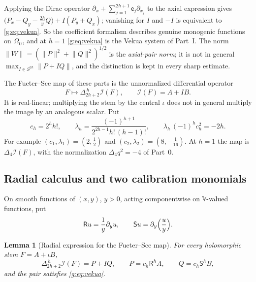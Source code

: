 \documentclass[11pt,a4paper]{article}
\numberwithin{equation}{section}
\newtheorem{lemma}[theorem]{Lemma}
\theoremstyle{definition}
\theoremstyle{remark}
\theoremstyle{plain}
\newcommand{\lap}{\Delta_4}
\newcommand{\I}{\mathcal I}
\newcommand{\Om}{\Omega}
\newcommand{\norm}[1]{\lVert #1\rVert}
\newcommand{\lapH}{\Delta_{2h+2}^{\,h}}
\newcommand{\VV}{\mathbb V}                       %
\begin{document}
Applying the Dirac operator $\partial_x+\sum_{j=1}^{2h+1}\mathsf e_j
\partial_{x_j}$ to the axial expression gives
$\bigl(P_x-Q_y-\tfrac{2h}{y}Q\bigr)+I(P_y+Q_x)$; vanishing for $I$ and $-I$ is
equivalent to \eqref{g:eq:vekua}. So the coefficient formalism describes
genuine monogenic functions on $\Om_U$, and at $h=1$ \eqref{g:eq:vekua} is the
Vekua system of Part~I. The norm $\norm W=(\norm P^2+\norm Q^2)^{1/2}$ is the
\emph{axial-pair norm}; it is not in general
$\max_{I\in S^{2h}}\norm{P+IQ}$, and the distinction is kept in every sharp
estimate.

The Fueter--Sce map of these parts is the unnormalized differential operator
\begin{equation}\label{g:eq:fueter-definition}
 F\longmapsto\lapH\I(F),\qquad \I(F)=A+IB .
\end{equation}
It is real-linear; multiplying the stem by the central $\iota$ does not in
general multiply the image by an analogous scalar. Put
\begin{equation}\label{g:eq:constants}
 c_h=2^hh!,\qquad
 \lambda_h=\frac{(-1)^{h+1}}{2^{2h-1}h!\,(h-1)!},\qquad
 \lambda_h\,(-1)^hc_h^2=-2h .
\end{equation}
For example $(c_1,\lambda_1)=(2,\tfrac12)$ and $(c_2,\lambda_2)=(8,-\tfrac1{16})$.
At $h=1$ the map is $\lap\I(F)$, with the normalization $\lap q^2=-4$ of
Part~0.

\subsection{Radial calculus and two calibration monomials}
\label{g:sub:radial}

On smooth functions of $(x,y)$, $y>0$, acting componentwise on $\VV$-valued
functions, put
\[
 \mathsf Ru=\frac1y\partial_yu,\qquad
 \mathsf Su=\partial_y\Bigl(\frac uy\Bigr).
\]

\begin{lemma}[Radial expression for the Fueter--Sce map]
\label{g:lem:radial}
For every holomorphic stem $F=A+\iota B$,
\begin{equation}\label{g:eq:radial}
 \lapH\I(F)=P+IQ,\qquad P=c_h\mathsf R^hA,\qquad Q=c_h\mathsf S^hB,
\end{equation}
and the pair satisfies \eqref{g:eq:vekua}.
\end{lemma}
\end{document}
